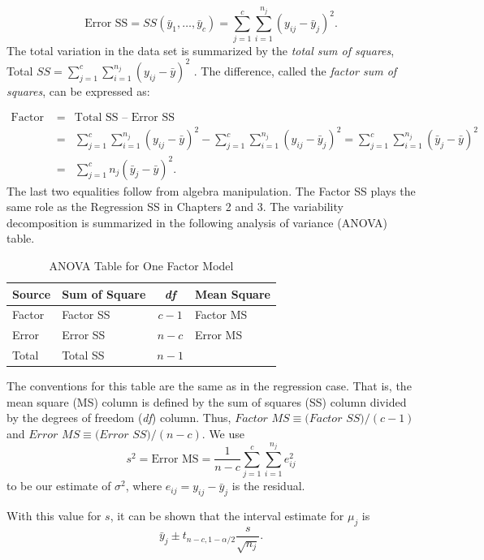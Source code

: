 \begin{equation*}
\text{Error SS} = SS(\bar{y}_1, \ldots, \bar{y}_{c}) =
\sum_{j=1}^{c} \sum_{i=1}^{n_j} \left(y_{ij}-\bar{y}_j \right)^2 .
\end{equation*}
The total variation in the data set is summarized by the
\textit{total sum of squares}, Total
$SS=\sum_{j=1}^{c}\sum_{i=1}^{n_j}(y_{ij}-\bar{y})^2$ . The
difference, called the \textit{factor sum of} \textit{squares}, can
be expressed as:

\begin{eqnarray*}
\textrm{Factor SS }&=& \textrm{Total SS -- Error SS} \\
&=& \sum_{j=1}^{c}\sum_{i=1}^{n_j}(y_{ij}-\bar{y})^2-\sum_{j=1}^{c}%
\sum_{i=1}^{n_j}(y_{ij}-\bar{y}_j)^2=\sum_{j=1}^{c}\sum_{i=1}^{n_j}(%
\bar{y}_j-\bar{y})^2 \\
&=& \sum_{j=1}^{c}n_j(\bar{y}_j-\bar{y})^2 .
\end{eqnarray*}
The last two equalities follow from algebra manipulation. The Factor
SS plays the same role as the Regression SS in Chapters 2 and 3. The
variability decomposition is summarized in the following analysis of
variance (ANOVA) table.
\newpage
\begin{table}[h]
\caption{\label{T4:ANOVAOneFactor} ANOVA Table for One Factor Model}
\begin{tabular}{llcl}
\hline Source & Sum of Square & \textit{df} & Mean Square \\
\hline
Factor & Factor SS & $c-1$ & Factor MS \\
Error  & Error SS  & $n-c$ & Error MS \\
Total  & Total SS  & $n-1$ & \\
\hline
\end{tabular}
\end{table}

\noindent The conventions for this table are the same as in the
regression case. That is, the mean square (MS) column is defined by
the sum of squares (SS) column divided by the degrees of freedom
(\textit{df}) column. Thus, $Factor$ $MS\equiv (Factor$ $SS)/(c-1)$
and $Error$ $MS\equiv (Error$ $SS)/(n-c)$. We use
\begin{equation*}
s^2=\text{Error MS}=\frac{1}{n-c} \sum_{j=1}^{c}\sum_{i=1}^{n_j}
e_{ij}^2
\end{equation*}
to be our estimate of $\sigma^2$, where $e_{ij}=y_{ij}-\bar{y}_j$ is
the residual.

With this value for $s$, it can be shown that the interval estimate
for $\mu_j$ is
\begin{equation}\label{E4:OneFactorConInt}
\bar{y}_j \pm t_{n-c,1-\alpha /2}\frac{s}{\sqrt{n_j}}.
\end{equation}

